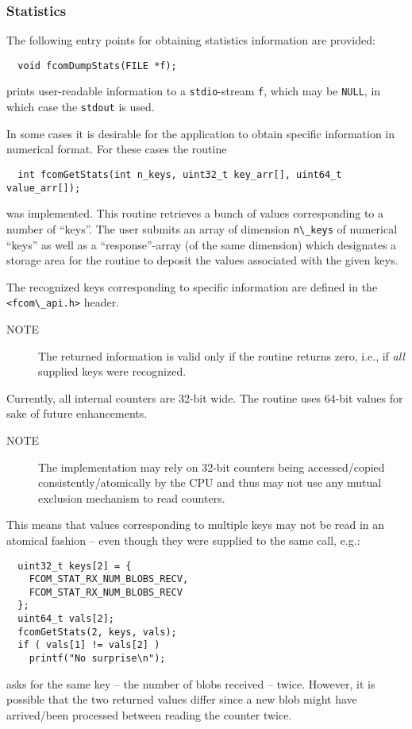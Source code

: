 \documentclass[11pt]{article}
\newcommand{\blob}{blob}
\newcommand{\cstl}[1]{{\lstinline+#1+}}
\newcommand{\note}[1]{
	\begin{description}
		\item[NOTE] #1
	\end{description}
}
\begin{document}
    \subsubsection{Statistics}
      The following entry points for obtaining statistics information are
      provided:
      \begin{verbatim}
  void fcomDumpStats(FILE *f);
      \end{verbatim}
      prints user-readable information to a \cstl{stdio}-stream
      \cstl{f}, which may be \cstl{NULL}, in which case
      the \cstl{stdout} is used.

      In some cases it is desirable for the application to obtain
      specific information in numerical format. For these cases
      the routine
      \begin{verbatim}
  int fcomGetStats(int n_keys, uint32_t key_arr[], uint64_t value_arr[]);
      \end{verbatim}
      was implemented. This routine retrieves a bunch of values
      corresponding to a number of ``keys''. The user submits an
      array of dimension \cstl{n\_keys} of numerical ``keys''
      as well as a ``response''-array (of the same dimension) which
      designates a storage area for the routine to deposit the
      values associated with the given keys.

      The recognized keys corresponding to specific information
      are defined in the \cstl{<fcom\_api.h>} header.
 
      \note{The returned information is valid only if the
      routine returns zero, i.e., if {\em all} supplied keys
      were recognized.}

      Currently, all internal counters are 32-bit wide. The
      routine uses 64-bit values for sake of future enhancements.

      \note{The implementation may rely on 32-bit counters
      being accessed/copied consistently/atomically by the CPU and thus
      may not use any mutual exclusion mechanism to read counters.}

      This means that values corresponding to multiple keys
      may not be read in an atomical fashion -- even though
      they were supplied to the same call, e.g.:
      \begin{verbatim}
  uint32_t keys[2] = {
    FCOM_STAT_RX_NUM_BLOBS_RECV,
    FCOM_STAT_RX_NUM_BLOBS_RECV
  };
  uint64_t vals[2];
  fcomGetStats(2, keys, vals);
  if ( vals[1] != vals[2] )
    printf("No surprise\n");
      \end{verbatim}
      asks for the same key -- the number of \blob{}s received --
      twice. However, it is possible that the two returned values
      differ since a new \blob{} might have arrived/been processed
      between reading the counter twice.
\end{document}

